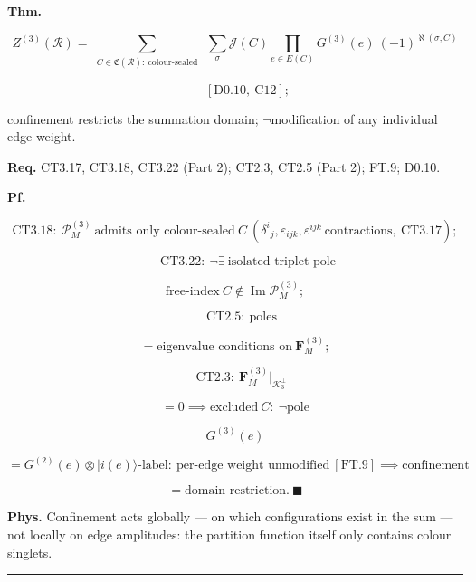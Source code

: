 \begin{theorem}\label{tag:FT-10}
\textbf{Thm.}

\[
Z^{(3)}(\mathcal R)=\sum_{\substack{C\in\mathfrak C(\mathcal R):\ \text{colour-sealed}}}\ \sum_\sigma\mathcal J(C)\!\!\prod_{e\in E(C)}\!\!G^{(3)}(e)\ (-1)^{\aleph(\sigma,C)}
\]

\[
\qquad [\mathrm{D0.10},\ \mathrm{C12}];
\]

confinement restricts the summation domain; $\neg$modification of any individual edge weight.

\textbf{Req.} CT3.17, CT3.18, CT3.22 (Part 2); CT2.3, CT2.5 (Part 2); FT.9; D0.10.

\textbf{Pf.}

\[
\mathrm{CT3.18}:\ \mathcal P_M^{(3)}\ \text{admits only colour-sealed}\ C\ (\delta^i{}_j,\varepsilon_{ijk},\varepsilon^{ijk}\ \text{contractions},\ \mathrm{CT3.17});
\]

\[
\qquad \mathrm{CT3.22}:\ \neg\exists\ \text{isolated triplet pole}
\]

\[
\text{free-index}\ C\notin\operatorname{Im}\mathcal P_M^{(3)};
\]

\[
\quad\mathrm{CT2.5}:\ \text{poles}
\]

\[
= \text{eigenvalue conditions on}\ \mathbf F_M^{(3)};
\]

\[
\quad\mathrm{CT2.3}:\ \mathbf F_M^{(3)}\big|_{\mathcal K_3^\perp}
\]

\[
= 0\implies\text{excluded}\ C:\ \neg\text{pole}
\]

\[
G^{(3)}(e)
\]

\[
= G^{(2)}(e)\otimes|i(e)\rangle\text{-label}:\ \text{per-edge weight unmodified}\ [\mathrm{FT.9}]\implies\text{confinement}
\]

\[
= \text{domain restriction}.\ \blacksquare
\]

\textbf{Phys.} Confinement acts globally — on which configurations exist in the sum — not locally on edge amplitudes: the partition function itself only contains colour singlets.

\vspace{2pt}\noindent\rule{\textwidth}{0.4pt}\vspace{2pt}

\end{theorem}

